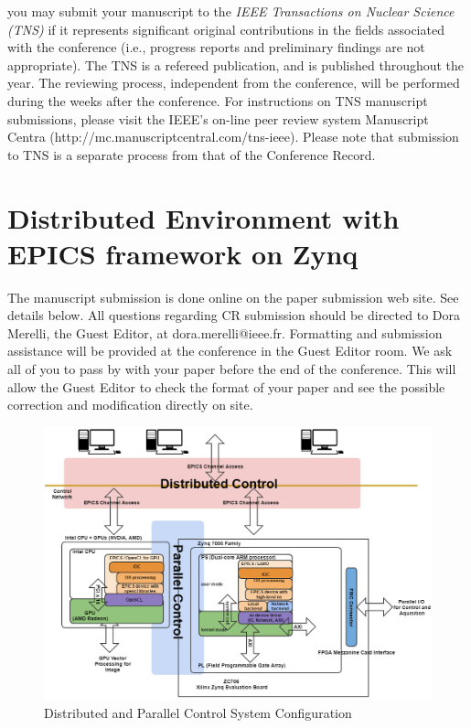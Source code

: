 \documentclass[journal]{IEEEtran}
\begin{document}

you may submit your manuscript to the \emph{IEEE Transactions on Nuclear Science (TNS)} if it represents significant original contributions in the fields associated with the conference (i.e., progress reports and preliminary findings are not appropriate).  The TNS is a refereed publication, and is published throughout the year. The reviewing process, independent from the conference, will be performed during the weeks after the conference. For instructions on TNS  manuscript submissions, please visit the IEEE's on-line peer review system Manuscript Centra   (http://mc.manuscriptcentral.com/tns-ieee). Please note that submission to TNS  is a separate process from that of the Conference Record.

\section{Distributed Environment with EPICS framework on Zynq}

The manuscript submission is done online on the paper submission web site.  See details below. All questions regarding CR submission should be directed to Dora Merelli, the Guest Editor, at dora.merelli@ieee.fr. Formatting and submission assistance will be provided at the conference in the Guest Editor room. We ask all of you to pass by with your paper before the end of the conference. This will allow the Guest Editor to check the format of your paper and see the possible correction and modification directly on site.



\begin{figure}[!tbh]
	\centering
	\includegraphics*[width=\textwidth,height=0.7\textwidth]{img01.png}
	\caption{Distributed and Parallel Control System Configuration}
	\label{control_system}
\end{figure}
\end{document}
